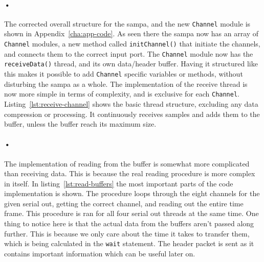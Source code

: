 \documentclass[a4paper, 12pt]{report}
\newcommand{\codeword}[1]{\texttt{#1}}
\begin{document}
\begin{minipage}{\linewidth}

\end{minipage}

\paragraph{•}
The corrected overall structure for the \gls{sampa}, and the new \codeword{Channel} module is shown in Appendix~\ref{cha:app-code}.
As seen there the \gls{sampa} now has an array of \codeword{Channel} modules, a new method called \codeword{initChannel()} that initiate the channels, and connects them to the correct input port.
The \codeword{Channel} module now has the \codeword{receiveData()} thread, and its own data/header buffer.
Having it structured like this makes it possible to add \codeword{Channel} specific variables or methods, without disturbing the \gls{sampa} as a whole.
The implementation of the receive thread is now more simple in terms of complexity, and is exclusive for each \codeword{Channel}.
Listing~\ref{lst:receive-channel} shows the basic thread structure, excluding any data compression or processing.
It continuously receives samples and adds them to the buffer, unless the buffer reach its maximum size.

\begin{minipage}{\linewidth}

\end{minipage}

\paragraph{•}
The implementation of reading from the buffer is somewhat more complicated than receiving data.
This is because the real reading procedure is more complex in itself.
In listing~\ref{lst:read-buffers} the most important parts of the code implementation is shown.
The procedure loops through the eight channels for the given serial out, getting the correct channel, and reading out the entire time frame.
This procedure is ran for all four serial out threads at the same time.
One thing to notice here is that the actual data from the buffers aren't passed along further.
This is because we only care about the time it takes to transfer them, which is being calculated in the \codeword{wait} statement.
The header packet is sent as it contains important information which can be useful later on.
\end{document}
